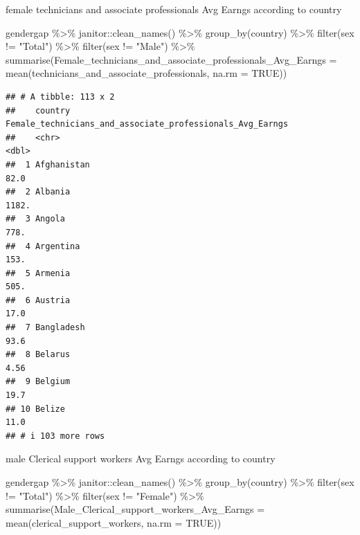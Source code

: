 \documentclass[
]{article}
\newenvironment{Shaded}{\begin{snugshade}}{\end{snugshade}}
\newcommand{\AttributeTok}[1]{\textcolor[rgb]{0.77,0.63,0.00}{#1}}
\newcommand{\ConstantTok}[1]{\textcolor[rgb]{0.00,0.00,0.00}{#1}}
\newcommand{\FunctionTok}[1]{\textcolor[rgb]{0.00,0.00,0.00}{#1}}
\newcommand{\NormalTok}[1]{#1}
\newcommand{\SpecialCharTok}[1]{\textcolor[rgb]{0.00,0.00,0.00}{#1}}
\newcommand{\StringTok}[1]{\textcolor[rgb]{0.31,0.60,0.02}{#1}}
\begin{document}
female technicians and associate professionals Avg Earngs according to
country

\begin{Shaded}
\begin{Highlighting}[]
\NormalTok{gendergap }\SpecialCharTok{\%\textgreater{}\%}
\NormalTok{  janitor}\SpecialCharTok{::}\FunctionTok{clean\_names}\NormalTok{() }\SpecialCharTok{\%\textgreater{}\%}
  \FunctionTok{group\_by}\NormalTok{(country) }\SpecialCharTok{\%\textgreater{}\%} 
  \FunctionTok{filter}\NormalTok{(sex }\SpecialCharTok{!=} \StringTok{"Total"}\NormalTok{) }\SpecialCharTok{\%\textgreater{}\%}
  \FunctionTok{filter}\NormalTok{(sex }\SpecialCharTok{!=} \StringTok{"Male"}\NormalTok{) }\SpecialCharTok{\%\textgreater{}\%}
  \FunctionTok{summarise}\NormalTok{(}\AttributeTok{Female\_technicians\_and\_associate\_professionals\_Avg\_Earngs =} \FunctionTok{mean}\NormalTok{(technicians\_and\_associate\_professionals, }\AttributeTok{na.rm =} \ConstantTok{TRUE}\NormalTok{))}
\end{Highlighting}
\end{Shaded}

\begin{verbatim}
## # A tibble: 113 x 2
##    country     Female_technicians_and_associate_professionals_Avg_Earngs
##    <chr>                                                           <dbl>
##  1 Afghanistan                                                     82.0 
##  2 Albania                                                       1182.  
##  3 Angola                                                         778.  
##  4 Argentina                                                      153.  
##  5 Armenia                                                        505.  
##  6 Austria                                                         17.0 
##  7 Bangladesh                                                      93.6 
##  8 Belarus                                                          4.56
##  9 Belgium                                                         19.7 
## 10 Belize                                                          11.0 
## # i 103 more rows
\end{verbatim}

male Clerical support workers Avg Earngs according to country

\begin{Shaded}
\begin{Highlighting}[]
\NormalTok{gendergap }\SpecialCharTok{\%\textgreater{}\%}
\NormalTok{  janitor}\SpecialCharTok{::}\FunctionTok{clean\_names}\NormalTok{() }\SpecialCharTok{\%\textgreater{}\%}
  \FunctionTok{group\_by}\NormalTok{(country) }\SpecialCharTok{\%\textgreater{}\%} 
   \FunctionTok{filter}\NormalTok{(sex }\SpecialCharTok{!=} \StringTok{"Total"}\NormalTok{) }\SpecialCharTok{\%\textgreater{}\%}
  \FunctionTok{filter}\NormalTok{(sex }\SpecialCharTok{!=} \StringTok{"Female"}\NormalTok{) }\SpecialCharTok{\%\textgreater{}\%}
  \FunctionTok{summarise}\NormalTok{(}\AttributeTok{Male\_Clerical\_support\_workers\_Avg\_Earngs =} \FunctionTok{mean}\NormalTok{(clerical\_support\_workers, }\AttributeTok{na.rm =} \ConstantTok{TRUE}\NormalTok{))}
\end{Highlighting}
\end{Shaded}
\end{document}
